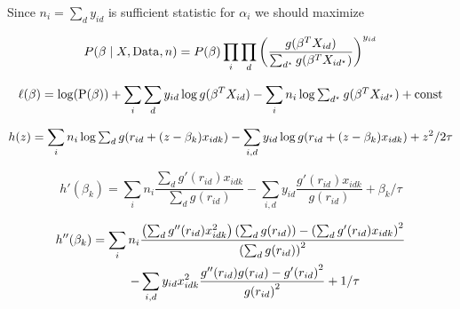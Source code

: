 \documentclass[12pt, letter]{article}
\begin{document}
Since $n_i = \sum_d y_{id}$ is sufficient statistic for $\alpha_i$ we should maximize

$$P(\beta\mid X, \mathrm{Data}, n) = P(\beta) \prod_i \prod_d
    \zag{\frac{g(\beta^T X_{id})}{\sum_{d^\star}g(\beta^T X_{id^\star})}}^{y_{id}}$$


$$\ell(\beta) = \log(\mathrm{P(\beta)}) + \sum_i \sum_d y_{id}\log{g(\beta^T X_{id})} -
    \sum_i n_i \log {\TS\sum_{d^\star}{g(\beta^T X_{id^\star})}} + \mathrm{const}$$

$$h(z) = \sum_i n_i \log {\TS\sum_{d}{g(r_{id} + (z-\beta_k) x_{idk})}} -
    \sum_{i,d} y_{id}\log{g(r_{id} + (z-\beta_k) x_{idk})} + z^2/2\tau$$

$$h'(\beta_k) = \sum_i n_i \frac{\sum_{d}g'(r_{id})x_{idk}}{\sum_{d} g(r_{id})} -
    \sum_{i,d} y_{id}\frac{g'(r_{id})x_{idk}}{ g(r_{id})} + \beta_k/\tau$$

\begin{equation*}
\begin{split}
h''(\beta_k) = \sum_i n_i& \frac{\zag{\sum_{d}g''(r_{id})x_{idk}^2}\zag{\sum_{d}g(r_{id})} - \zag{\sum_{d}g'(r_{id})x_{idk}}^2 }{\zag{\sum_{d} g(r_{id})}^2} \\ -&
\sum_{i,d} y_{id}x_{idk}^2\frac{g''(r_{id})g(r_{id})- {g'(r_{id})}^2}{{g(r_{id})}^2} + 1/\tau
\end{split}
\end{equation*}


\end{document}
